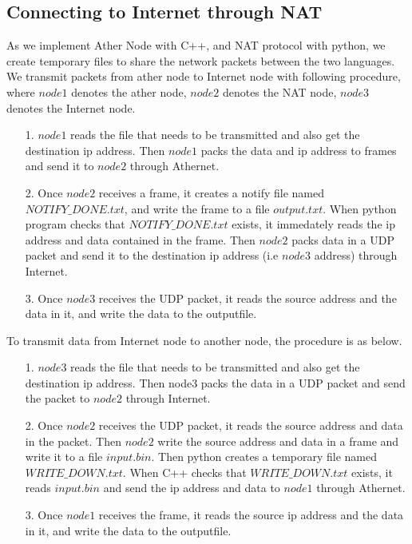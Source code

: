 \documentclass[11pt, conference]{IEEEtran}
\begin{document}
\subsection{Connecting to Internet through NAT}

As we implement Ather Node with C++, and NAT protocol with python, we create temporary files to share the network packets
between the two languages. We transmit packets from ather node to Internet node with following procedure, where $node1$ denotes the ather node,
$node2$ denotes the NAT node, $node3$ denotes the Internet node.
\begin{enumerate}
    \item [1.] $node1$ reads the file that needs to be transmitted and also get the destination ip address. Then $node1$ packs the data and ip address to frames and send it to $node2$ through Athernet.
    \item [2.] Once $node2$ receives a frame, it creates a notify file named $NOTIFY\_DONE.txt$, and write the frame to a file $output.txt$. When python program checks that $NOTIFY\_DONE.txt$ exists,
                it immedately reads the ip address and data contained in the frame. Then $node2$ packs data in a UDP packet and send it to the destination ip address (i.e $node3$ address) through Internet.
    \item [3.] Once $node3$ receives the UDP packet, it reads the source address and the data in it, and write the data to the outputfile.            
\end{enumerate}
To transmit data from Internet node to another node, the procedure is as below.
\begin{enumerate}
    \item [1.] $node3$ reads the file that needs to be transmitted and also get the destination ip address. Then node3 packs the data in a UDP packet and send the packet to $node2$
               through Internet.
    \item [2.] Once $node2$ receives the UDP packet, it reads the source address and data in the packet. Then $node2$ write the source address and data in a frame and write it to a file $input.bin$. Then python creates a temporary
    file named $WRITE\_DOWN.txt$. When C++ checks that $WRITE\_DOWN.txt$ exists, it reads $input.bin$ and send the ip address and data to $node1$ through Athernet.
    \item [3.] Once $node1$ receives the frame, it reads the source ip address and the data in it, and write the data to the outputfile.
\end{enumerate}
\end{document}
